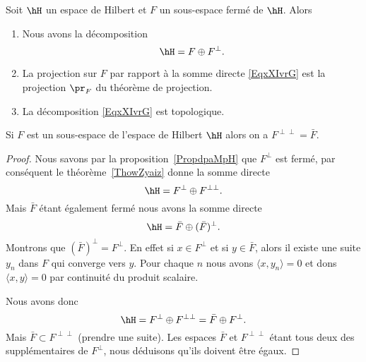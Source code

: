 \begin{theorem}     \label{ThowZyaiz}
	Soit \( \hH\) un espace de Hilbert et \( F\) un sous-espace fermé de \( \hH\). Alors
	\begin{enumerate}
		\item
		      Nous avons la décomposition
		      \begin{equation}        \label{EqxXIvrG}
			      \hH=F\oplus F^{\perp}.
		      \end{equation}
		\item       \label{ItemThowZyaizii}
		      La projection sur \( F\) par rapport à la somme directe \eqref{EqxXIvrG} est la projection \( \pr_F\) du théorème de projection.
		\item
		      La décomposition \eqref{EqxXIvrG} est topologique.
	\end{enumerate}
\end{theorem}

\begin{proposition}
	Si \( F\) est un sous-espace de l'espace de Hilbert \( \hH\) alors on a \( F^{\perp\perp}=\bar F\).
\end{proposition}

\begin{proof}
	Nous savons par la proposition~\ref{PropdpaMpH} que \( F^{\perp}\) est fermé, par conséquent le théorème~\ref{ThowZyaiz} donne la somme directe
	\begin{equation}
		\hH=F^{\perp}\oplus F^{\perp\perp}.
	\end{equation}
	Mais \( \bar F\) étant également fermé nous avons la somme directe
	\begin{equation}
		\hH=\bar F\oplus(\bar F)^{\perp}.
	\end{equation}
	Montrons que \( (\bar F)^{\perp}=F^{\perp}\). En effet si \( x\in F^{\perp}\) et si \( y\in \bar F\), alors il existe une suite \( y_n\) dans \( F\) qui converge vers \( y\). Pour chaque \( n\) nous avons \( \langle x, y_n\rangle =0\) et dons \( \langle x, y\rangle =0\) par continuité du produit scalaire.

	Nous avons donc
	\begin{equation}
		\hH=F^{\perp}\oplus F^{\perp\perp}=\bar F\oplus F^{\perp}.
	\end{equation}
	Mais \( \bar F\subset F^{\perp\perp}\) (prendre une suite). Les espaces \( \bar F\) et \( F^{\perp\perp}\) étant tous deux des supplémentaires de \( F^{\perp}\), nous déduisons qu'ils doivent être égaux.
\end{proof}

